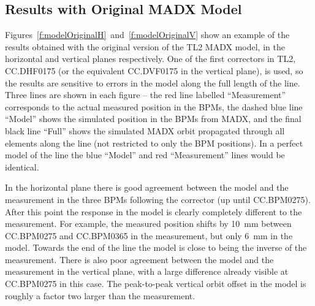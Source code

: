 \subsection{Results with Original MADX Model}
\label{ss:opticsResults}

Figures~\ref{f:modelOriginalH}~and~\ref{f:modelOriginalV} show an example of the results obtained with the original version of the TL2 MADX model, in the horizontal and vertical planes respectively. One of the first correctors in TL2, CC.DHF0175 (or the equivalent CC.DVF0175 in the vertical plane), is used, so the results are sensitive to errors in the model along the full length of the line. Three lines are shown in each figure -- the red line labelled ``Measurement'' corresponds to the actual measured position in the BPMs, the dashed blue line ``Model'' shows the simulated position in the BPMs from MADX, and the final black line ``Full'' shows the simulated MADX orbit propagated through all elements along the line (not restricted to only the BPM positions). In a perfect model of the line the blue ``Model'' and red ``Measurement'' lines would be identical.

In the horizontal plane there is good agreement between the model and the measurement in the three BPMs following the corrector (up until CC.BPM0275). After this point the response in the model is clearly completely different to the measurement. For example, the measured position shifts by 10~mm between CC.BPM0275 and CC.BPM0365 in the measurement, but only 6~mm in the model. Towards the end of the line the model is close to being the inverse of the measurement. There is also poor agreement between the model and the measurement in the vertical plane, with a large difference already visible at CC.BPM0275 in this case. The peak-to-peak vertical orbit offset in the model is roughly a factor two larger than the measurement.

